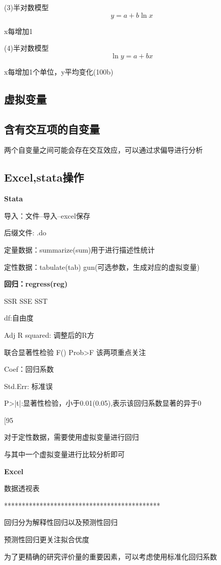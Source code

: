 \documentclass{article}
\begin{document}
(3)半对数模型
$$
y=a+b\ln x
$$

x每增加1%

(4)半对数模型
$$
\ln y=a+bx
$$

x每增加1个单位，y平均变化(100b)%

\subsection{虚拟变量}



\subsection{含有交互项的自变量}

两个自变量之间可能会存在交互效应，可以通过求偏导进行分析

\subsection{Excel,stata操作}
\textbf{Stata}

导入：文件--导入--excel保存

后缀文件: .do

定量数据：summarize(sum)用于进行描述性统计

定性数据：tabulate(tab)  gun(可选参数，生成对应的虚拟变量)

\textbf{回归：regress(reg)}

SSR SSE SST

df:自由度

Adj R squared: 调整后的R方

联合显著性检验 F()   Prob>F  该两项重点关注

Coef：回归系数

Std.Err: 标准误

P>|t|:显著性检验，小于0.01(0.05),表示该回归系数显著的异于0

[95%

对于定性数据，需要使用虚拟变量进行回归

与其中一个虚拟变量进行比较分析即可

\textbf{Excel}

数据透视表

********************************************

回归分为解释性回归以及预测性回归

预测性回归更关注拟合优度

为了更精确的研究评价量的重要因素，可以考虑使用标准化回归系数
\end{document}

